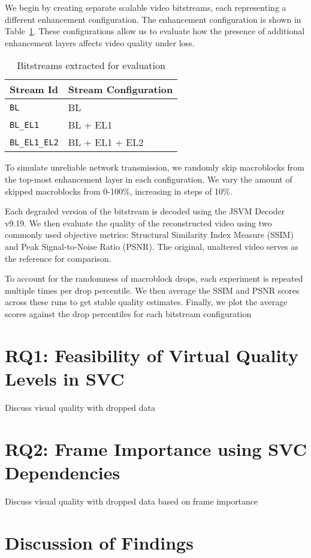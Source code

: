         We begin by creating separate scalable video bitstreams, each
        representing a different enhancement configuration. The enhancement
        configuration is shown in Table~\ref{tab:bitstreams}.  These
        configurations allow us to evaluate how the presence of additional
        enhancement layers affects video quality under loss.


        \begin{table}[H]
            \centering
            \begin{tabular}{ll}
                \toprule
                Stream Id               & Stream Configuration   \\
                \midrule
                \texttt{BL}             & BL                \\
                \texttt{BL\_EL1}        & BL + EL1          \\
                \texttt{BL\_EL1\_EL2}   & BL + EL1 + EL2    \\
                \bottomrule
            \end{tabular}
            \caption{Bitstreams extracted for evaluation}
            \label{tab:bitstreams}
        \end{table}
        

        To simulate unreliable network transmission, we randomly skip
        macroblocks from the top-most enhancement layer in each configuration.
        We vary the amount of skipped macroblocks from 0-100\%, increasing
        in steps of 10\%.

        Each degraded version of the bitstream is decoded using the JSVM Decoder
        v9.19.  We then evaluate the quality of the reconstructed video using
        two commonly used objective metrics: Structural Similarity Index Measure
        (SSIM) and Peak Signal-to-Noise Ratio (PSNR). The original, unaltered
        video serves as the reference for comparison.

        To account for the randomness of macroblock drops, each experiment is
        repeated multiple times per drop percentile.  We then average the SSIM
        and PSNR scores across these runs to get stable quality estimates. 
        Finally, we plot the average scores against the drop percentiles for
        each bitstream configuration



\section{\textbf{RQ1}: Feasibility of Virtual Quality Levels in SVC}
    Discuss visual quality with dropped data

\section{\textbf{RQ2}: Frame Importance using SVC Dependencies}
    Discuss visual quality with dropped data based on frame importance

\section{Discussion of Findings}